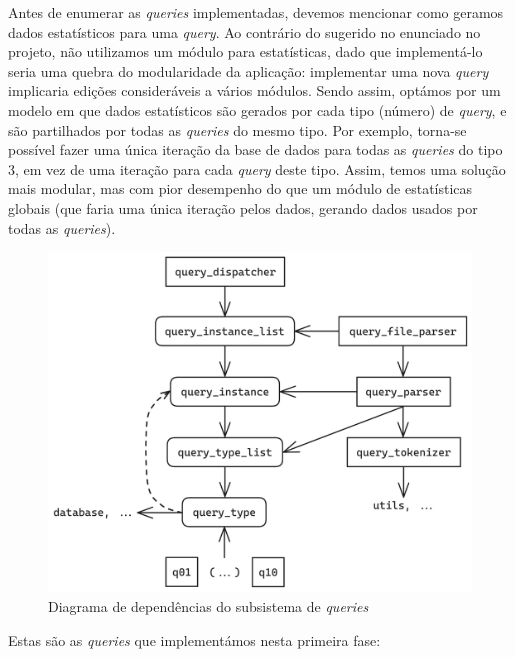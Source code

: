 \documentclass[12pt, a4paper]{article}
\begin{document}
Antes de enumerar as \emph{queries} implementadas, devemos mencionar como geramos dados estatísticos
para uma \emph{query}. Ao contrário do sugerido no enunciado no projeto, não utilizamos um módulo
para estatísticas, dado que implementá-lo seria uma quebra do modularidade da aplicação: implementar
uma nova \emph{query} implicaria edições consideráveis a vários módulos. Sendo assim, optámos por um
modelo em que dados estatísticos são gerados por cada tipo (número) de \emph{query}, e são
partilhados por todas as \emph{queries} do mesmo tipo. Por exemplo, torna-se possível fazer uma
única iteração da base de dados para todas as \emph{queries} do tipo 3, em vez de uma iteração para
cada \emph{query} deste tipo. Assim, temos uma solução mais modular, mas com pior desempenho do que
um módulo de estatísticas globais (que faria uma única iteração pelos dados, gerando dados usados
por todas as \emph{queries}).

\begin{figure}[h]
    \centering
    \includegraphics[scale=0.19]{res/queries.png}
    \caption{Diagrama de dependências do subsistema de \emph{queries}}
    \label{fig:queries}
\end{figure}

Estas são as \emph{queries} que implementámos nesta primeira fase:
\end{document}
